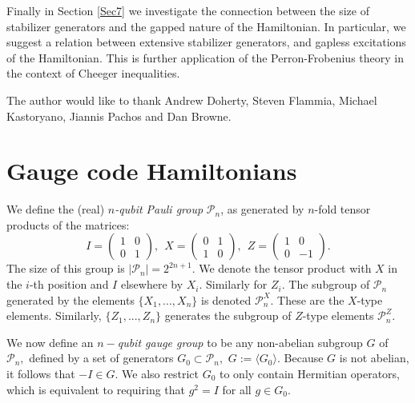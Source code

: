 \documentclass[11pt,oneside]{article}
\def\Pauli{\mathcal{P}}
\begin{document}
Finally in Section \ref{Sec7} 
we investigate the connection between the size of
stabilizer generators
and the gapped nature of the Hamiltonian.
In particular, we suggest a relation between
extensive stabilizer generators, and gapless excitations of
the Hamiltonian.
This is further application of the Perron-Frobenius 
theory in the context of Cheeger inequalities.


\vskip 5pt 
The author would like to thank 
Andrew Doherty,
Steven Flammia,
Michael Kastoryano,
Jiannis Pachos and 
Dan Browne.

\section{Gauge code Hamiltonians}%

We define
the (real) {\it $n$-qubit Pauli group} $\Pauli_n$, 
as generated by $n$-fold tensor products of the matrices:
$$
I = \left( \begin{array}{ll} 1&0\\ 0&1\end{array} \right),\ \ 
X = \left( \begin{array}{ll} 0&1\\ 1&0\end{array} \right),\ \ 
Z = \left( \begin{array}{ll} 1&0\\ 0&-1\end{array} \right).
$$
The size of this group is $ |\Pauli_n| = 2^{2n+1}.$
We denote the tensor product with $X$ in the $i$-th
position and $I$ elsewhere by $X_i$. Similarly for $Z_i.$
The subgroup of $\Pauli_n$ generated by
the elements $\{X_1,...,X_n\}$ %
is denoted $\Pauli_n^X.$ These are the $X$-type
elements. Similarly,
 $\{Z_1,...,Z_n\}$ generates %
the subgroup of $Z$-type elements $\Pauli_n^Z$.

We now define an {\it $n-$qubit gauge group} to be 
any non-abelian subgroup $G$ of $\Pauli_n,$
defined by a set of generators $G_0\subset \Pauli_n,$
$ G := \langle G_0\rangle.$
Because $G$ is not abelian, it follows that $-I\in G.$
We also restrict $G_0$ to only contain Hermitian operators,
which is equivalent to requiring that $g^2=I$ for all $g\in G_0.$
\end{document}
